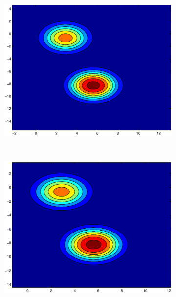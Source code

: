 \documentclass[useAMS,usenatbib,fleqn]{mn2e}
\begin{document}
\begin{figure}
         \begin{subfigure}[b]{0.3\columnwidth}
               \includegraphics[width=\textwidth]{figures/GL2.eps}
        \end{subfigure}
        ~
         \begin{subfigure}[b]{0.3\columnwidth}
               \includegraphics[width=\textwidth]{figures/VL2.eps}
        \end{subfigure}
        ~
        \begin{subfigure}[b]{0.3\columnwidth}

\end{subfigure}
\end{figure}
\end{document}
